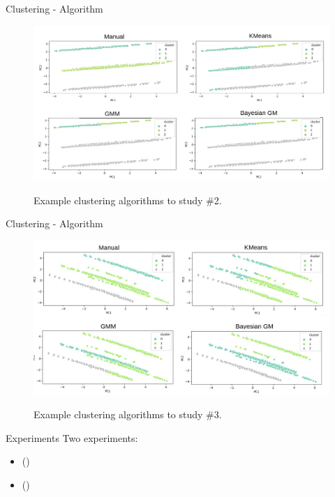 \begin{frame}{Clustering - Algorithm}
    \begin{figure}
        \centering
        \includegraphics[width=\linewidth]{fig/ch3-cluster-algo-ex2.png}
        \label{fig:cluster-algo-ex2}
        \caption{Example clustering algorithms to study \#2.} 
    \end{figure}
\end{frame}


\begin{frame}{Clustering - Algorithm}
    \begin{figure}
        \centering
        \includegraphics[width=\linewidth]{fig/ch3-cluster-algo-ex3.png}
        \label{fig:cluster-algo-ex3}
        \caption{Example clustering algorithms to study \#3.} 
    \end{figure}
\end{frame}


\begin{frame}{Experiments} \pause
    Two experiments: \pause
    \begin{itemize}
        \item \fullNameExperimentI{} (\nameExperimentI{}) \pause
        \item \fullNameExperimentII{} (\nameExperimentII{})
    \end{itemize}
\end{frame}

